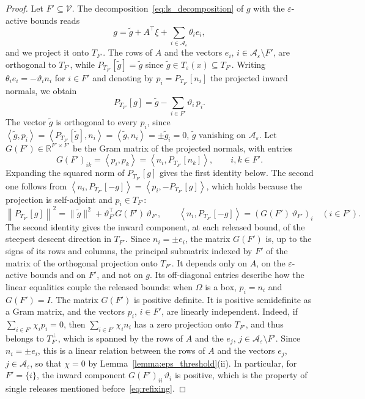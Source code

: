 \documentclass{article}
\numberwithin{equation}{section}
\newcommand{\RR}{{\mathbb{R}}} %
\newcommand{\calA}{{\mathcal{A}}}
\newcommand{\inner}[2]{\left\langle {#1} , {#2} \right\rangle} %
\newcommand{\proj}[2]{P_{#1} \left[ {#2} \right]} %
\theoremstyle{plain}
\begin{document}
\begin{proof}
	Let $F' \subseteq \mathcal{V}$. The decomposition~\eqref{eq:ls_decomposition} of $g$ with the $\varepsilon$-active bounds reads
	\[g = \tilde{g} + A^\top\xi + \sum_{i\in\calA_\varepsilon}\theta_ie_i,\]
	and we project it onto $T_{F'}$. The rows of $A$ and the vectors $e_i$, $i \in \calA_\varepsilon\setminus F'$, are orthogonal to $T_{F'}$, while $\proj{T_{F'}}{\tilde{g}} = \tilde{g}$ since $\tilde{g} \in T_\varepsilon(x) \subseteq T_{F'}$. Writing $\theta_ie_i = -\vartheta_in_i$ for $i \in F'$ and denoting by $p_i = \proj{T_{F'}}{n_i}$ the projected inward normals, we obtain
	\[\proj{T_{F'}}{g} = \tilde{g} - \sum_{i\in F'}\vartheta_i\,p_i.\]
	The vector $\tilde{g}$ is orthogonal to every $p_i$, since $\inner{\tilde{g}}{p_i} = \inner{\proj{T_{F'}}{\tilde{g}}}{n_i} = \inner{\tilde{g}}{n_i} = \pm\tilde{g}_i = 0$, $\tilde{g}$ vanishing on $\calA_\varepsilon$. Let $G(F') \in \RR^{F'\times F'}$ be the Gram matrix of the projected normals, with entries
	\[G(F')_{ik} = \inner{p_i}{p_k} = \inner{n_i}{\proj{T_{F'}}{n_k}}, \qquad i,k \in F'.\]
	Expanding the squared norm of $\proj{T_{F'}}{g}$ gives the first identity below. The second one follows from $\inner{n_i}{\proj{T_{F'}}{-g}} = \inner{p_i}{-\proj{T_{F'}}{g}}$, which holds because the projection is self-adjoint and $p_i \in T_{F'}$:
	\begin{equation}\label{eq:gram_expression}
		\left\|\proj{T_{F'}}{g}\right\|^2 = \|\tilde{g}\|^2 + \vartheta_{F'}^\top G(F')\,\vartheta_{F'}, \qquad \inner{n_i}{\proj{T_{F'}}{-g}} = \left(G(F')\,\vartheta_{F'}\right)_i \quad (i \in F').
	\end{equation}
	The second identity gives the inward component, at each released bound, of the steepest descent direction in $T_{F'}$. Since $n_i = \pm e_i$, the matrix $G(F')$ is, up to the signs of its rows and columns, the principal submatrix indexed by $F'$ of the matrix of the orthogonal projection onto $T_{F'}$. It depends only on $A$, on the $\varepsilon$-active bounds and on $F'$, and not on $g$. Its off-diagonal entries describe how the linear equalities couple the released bounds: when $\Omega$ is a box, $p_i = n_i$ and $G(F') = I$. The matrix $G(F')$ is positive definite. It is positive semidefinite as a Gram matrix, and the vectors $p_i$, $i \in F'$, are linearly independent. Indeed, if $\sum_{i\in F'}\chi_ip_i = 0$, then $\sum_{i\in F'}\chi_in_i$ has a zero projection onto $T_{F'}$, and thus belongs to $T_{F'}^\perp$, which is spanned by the rows of $A$ and the $e_j$, $j \in \calA_\varepsilon\setminus F'$. Since $n_i = \pm e_i$, this is a linear relation between the rows of $A$ and the vectors $e_j$, $j \in \calA_\varepsilon$, so that $\chi = 0$ by Lemma~\ref{lemma:eps_threshold}(ii). In particular, for $F' = \{i\}$, the inward component $G(F')_{ii}\,\vartheta_i$ is positive, which is the property of single releases mentioned before~\eqref{eq:refixing}.


\end{proof}
\end{document}
